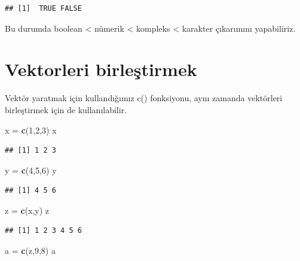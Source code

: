 \documentclass[]{book}
\newenvironment{Shaded}{\begin{snugshade}}{\end{snugshade}}
\newcommand{\DecValTok}[1]{\textcolor[rgb]{0.00,0.00,0.81}{#1}}
\newcommand{\KeywordTok}[1]{\textcolor[rgb]{0.13,0.29,0.53}{\textbf{#1}}}
\newcommand{\NormalTok}[1]{#1}
\newcommand{\StringTok}[1]{\textcolor[rgb]{0.31,0.60,0.02}{#1}}
\begin{document}
\begin{verbatim}
## [1]  TRUE FALSE
\end{verbatim}

Bu durumda boolean \textless{} nümerik \textless{} kompleks \textless{}
karakter çıkarımını yapabiliriz.

\hypertarget{vektorleri-birlestirmek}{%
\section{Vektorleri birleştirmek}\label{vektorleri-birlestirmek}}

Vektör yaratmak için kullandığımız c() fonksiyonu, aynı zamanda
vektörleri birleştirmek için de kullanılabilir.

\begin{Shaded}
\begin{Highlighting}[]
\NormalTok{x =}\StringTok{ }\KeywordTok{c}\NormalTok{(}\DecValTok{1}\NormalTok{,}\DecValTok{2}\NormalTok{,}\DecValTok{3}\NormalTok{)}
\NormalTok{x}
\end{Highlighting}
\end{Shaded}

\begin{verbatim}
## [1] 1 2 3
\end{verbatim}

\begin{Shaded}
\begin{Highlighting}[]
\NormalTok{y =}\StringTok{ }\KeywordTok{c}\NormalTok{(}\DecValTok{4}\NormalTok{,}\DecValTok{5}\NormalTok{,}\DecValTok{6}\NormalTok{)}
\NormalTok{y}
\end{Highlighting}
\end{Shaded}

\begin{verbatim}
## [1] 4 5 6
\end{verbatim}

\begin{Shaded}
\begin{Highlighting}[]
\NormalTok{z =}\StringTok{ }\KeywordTok{c}\NormalTok{(x,y)}
\NormalTok{z}
\end{Highlighting}
\end{Shaded}

\begin{verbatim}
## [1] 1 2 3 4 5 6
\end{verbatim}

\begin{Shaded}
\begin{Highlighting}[]
\NormalTok{a =}\StringTok{ }\KeywordTok{c}\NormalTok{(z,}\DecValTok{9}\NormalTok{,}\DecValTok{8}\NormalTok{)}
\NormalTok{a}
\end{Highlighting}
\end{Shaded}
\end{document}
